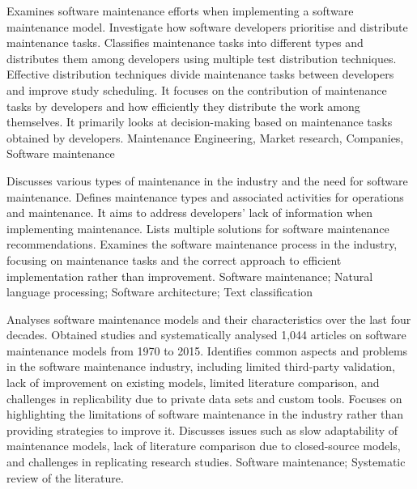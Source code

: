 {
    Examines software maintenance efforts when implementing a software maintenance model. Investigate how software developers prioritise and distribute maintenance tasks.
}
{
    Classifies maintenance tasks into different types and distributes them among developers using multiple test distribution techniques.
}
{
    Effective distribution techniques divide maintenance tasks between developers and improve study scheduling.
}
{
    It focuses on the contribution of maintenance tasks by developers and how efficiently they distribute the work among themselves. It primarily looks at decision-making based on maintenance tasks obtained by developers.
}
{
    Maintenance Engineering, Market research, Companies, Software maintenance
}

{
    Discusses various types of maintenance in the industry and the need for software maintenance. Defines maintenance types and associated activities for operations and maintenance.
}
{
    It aims to address developers' lack of information when implementing maintenance.
}
{
    Lists multiple solutions for software maintenance recommendations.
}
{
    Examines the software maintenance process in the industry, focusing on maintenance tasks and the correct approach to efficient implementation rather than improvement.
}
{
    Software maintenance; Natural language processing; Software architecture; Text classification
}

{
    Analyses software maintenance models and their characteristics over the last four decades.
}
{
    Obtained studies and systematically analysed 1,044 articles on software maintenance models from 1970 to 2015.
}
{
    Identifies common aspects and problems in the software maintenance industry, including limited third-party validation, lack of improvement on existing models, limited literature comparison, and challenges in replicability due to private data sets and custom tools.
}
{
    Focuses on highlighting the limitations of software maintenance in the industry rather than providing strategies to improve it. Discusses issues such as slow adaptability of maintenance models, lack of literature comparison due to closed-source models, and challenges in replicating research studies.
}
{
    Software maintenance; Systematic review of the literature.
}


